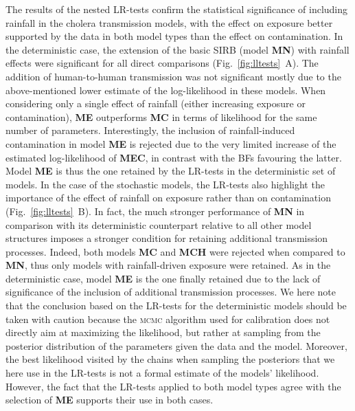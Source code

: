 The results of the nested LR-tests confirm the statistical significance of including rainfall in the cholera transmission models, with the effect on exposure better supported by the data in both model types than the effect on contamination. In the deterministic case, the extension of the basic SIRB (model \textbf{MN}) with rainfall effects were significant for all direct comparisons (Fig.~\ref{fig:lltests}~A). The addition of human-to-human transmission was not significant mostly due to the above-mentioned lower estimate of the log-likelihood in these models. When considering only a single effect of rainfall (either increasing exposure or contamination), \textbf{ME} outperforms \textbf{MC} in terms of likelihood for the same number of parameters. Interestingly, the inclusion of rainfall-induced contamination in model \textbf{ME} is rejected due to the very limited increase of the estimated log-likelihood of \textbf{MEC}, in contrast with the BFs favouring the latter. Model \textbf{ME} is thus the one retained by the LR-tests in the deterministic set of models. In the case of the stochastic models, the LR-tests also highlight the importance of the effect of rainfall on exposure rather than on contamination (Fig.~\ref{fig:lltests}~B). In fact, the much stronger performance of \textbf{MN} in comparison with its deterministic counterpart relative to all other model structures imposes a stronger condition for retaining additional transmission processes. Indeed, both models \textbf{MC} and \textbf{MCH} were rejected when compared to \textbf{MN}, thus only models with rainfall-driven exposure were retained. As in the deterministic case, model \textbf{ME} is the one finally retained due to the lack of significance of the inclusion of additional transmission processes. We here note that the conclusion based on the LR-tests for the deterministic models should be taken with caution because the \textsc{mcmc} algorithm used for calibration does not directly aim at maximizing the likelihood, but rather at sampling from the posterior distribution of the parameters given the data and the model. Moreover, the best likelihood visited by the chains when sampling the posteriors that we here use in the LR-tests is not a formal estimate of the models' likelihood. However, the fact that the LR-tests applied to both model types agree with the selection of \textbf{ME} supports their use in both cases.

